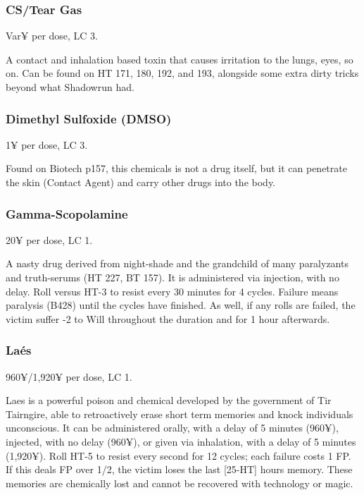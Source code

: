 \subsubsection{CS/Tear Gas}
\begin{flushleft}
	Var¥ per dose, LC 3. 
\end{flushleft}

A contact and inhalation based toxin that causes irritation to the lungs, eyes, so on. Can be found on HT 171, 180, 192, and 193, alongside some extra dirty tricks beyond what Shadowrun had.

\subsubsection{Dimethyl Sulfoxide (DMSO)}
\begin{flushleft}
	1¥ per dose, LC 3. 
\end{flushleft}

Found on Biotech p157, this chemicals is not a drug itself, but it can penetrate the skin (Contact Agent) and carry other drugs into the body.

\subsubsection{Gamma-Scopolamine}
\begin{flushleft}
	20¥ per dose, LC 1. 
\end{flushleft}

A nasty drug derived from night-shade and the grandchild of many paralyzants and truth-serums (HT 227, BT 157). It is administered via injection, with no delay. Roll versus HT-3 to resist every 30 minutes for 4 cycles. Failure means paralysis (B428) until the cycles have finished. As well, if any rolls are failed, the victim suffer -2 to Will throughout the duration and for 1 hour afterwards.

\subsubsection{Laés}
\begin{flushleft}
	960¥/1,920¥ per dose, LC 1.
\end{flushleft}

Laes is a powerful poison and chemical developed by the government of Tir Tairngire, able to retroactively erase short term memories and knock individuals unconscious. It can be administered orally, with a delay of 5 minutes (960¥), injected, with no delay (960¥), or given via inhalation, with a delay of 5 minutes (1,920¥). Roll HT-5 to resist every second for 12 cycles; each failure costs 1 FP. If this deals FP over 1/2, the victim loses the last [25-HT] hours memory. These memories are chemically lost and cannot be recovered with technology or magic.

